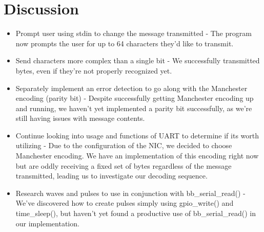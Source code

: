 \documentclass{article}
\begin{document}
\section*{Discussion}
\begin{itemize}
\item Prompt user using stdin to change the message transmitted - The program now prompts the user for up to 64 characters they'd like to transmit.
\item Send characters more complex than a single bit - We successfully transmitted bytes, even if they're not properly recognized yet.
\item Separately implement an error detection to go along with the Manchester encoding (parity bit) - Despite successfully getting Manchester encoding up and running, we haven't yet implemented a parity bit successfully, as we're still having issues with message contents.
\item Continue looking into usage and functions of UART to determine if its worth utilizing - Due to the configuration of the NIC, we decided to choose Manchester encoding. We have an implementation of this encoding right now but are oddly receiving a fixed set of bytes regardless of the message transmitted, leading us to investigate our decoding sequence.
\item Research waves and pulses to use in conjunction with bb\_serial\_read() - We've discovered how to create pulses simply using gpio\_write() and time\_sleep(), but haven't yet found a productive use of bb\_serial\_read() in our implementation.

\end{itemize}
\end{document}
